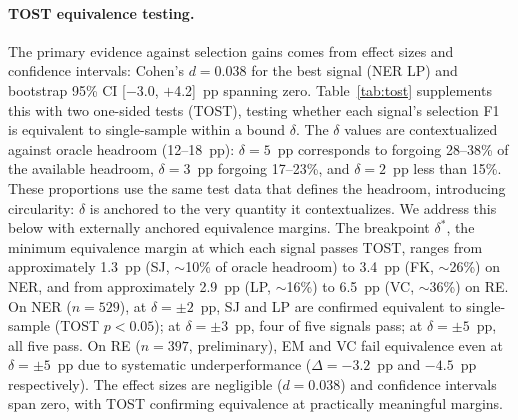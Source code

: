 \paragraph{TOST equivalence testing.}\label{app:tost}
The primary evidence against selection gains comes from effect sizes and confidence intervals: Cohen's $d{=}0.038$ for the best signal (NER LP) and bootstrap 95\% CI [$-$3.0, $+$4.2]~pp spanning zero.
Table~\ref{tab:tost} supplements this with two one-sided tests (TOST), testing whether each signal's selection F1 is equivalent to single-sample within a bound $\delta$.
The $\delta$ values are contextualized against oracle headroom (12--18~pp): $\delta{=}5$~pp corresponds to forgoing 28--38\% of the available headroom, $\delta{=}3$~pp forgoing 17--23\%, and $\delta{=}2$~pp less than 15\%.
These proportions use the same test data that defines the headroom, introducing circularity: $\delta$ is anchored to the very quantity it contextualizes.
We address this below with externally anchored equivalence margins.
The breakpoint $\delta^*$, the minimum equivalence margin at which each signal passes TOST, ranges from approximately 1.3~pp (SJ, ${\sim}$10\% of oracle headroom) to 3.4~pp (FK, ${\sim}$26\%) on NER, and from approximately 2.9~pp (LP, ${\sim}$16\%) to 6.5~pp (VC, ${\sim}$36\%) on RE.
On NER ($n{=}529$), at $\delta{=}{\pm}2$~pp, SJ and LP are confirmed equivalent to single-sample (TOST $p{<}0.05$); at $\delta{=}{\pm}3$~pp, four of five signals pass; at $\delta{=}{\pm}5$~pp, all five pass.
On RE ($n{=}397$, preliminary), EM and VC fail equivalence even at $\delta{=}{\pm}5$~pp due to systematic underperformance ($\Delta{=}{-}3.2$~pp and $-4.5$~pp respectively).
The effect sizes are negligible ($d{=}0.038$) and confidence intervals span zero, with TOST confirming equivalence at practically meaningful margins.

